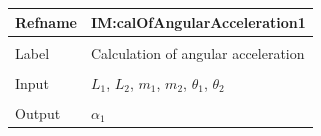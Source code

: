 \documentclass[12pt]{article}
\begin{document}
\vspace{\baselineskip}
\noindent
\begin{minipage}{\textwidth}
\begin{tabular}{>{\raggedright}p{}>{\raggedright\arraybackslash}p{}}
\toprule \textbf{Refname} & \textbf{IM:calOfAngularAcceleration1}
\label{IM:calOfAngularAcceleration1}
\\ \midrule \\
Label & Calculation of angular acceleration
        
\\ \midrule \\
Input & ${L_{1}}$, ${L_{2}}$, ${m_{1}}$, ${m_{2}}$, ${θ_{1}}$, ${θ_{2}}$
        
\\ \midrule \\
Output & ${α_{1}}$
         

\end{tabular}
\end{minipage}
\end{document}
